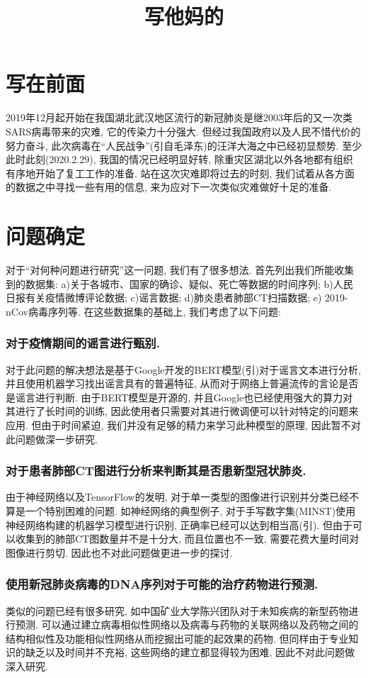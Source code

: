 \documentclass[lang=cn,11pt]{elegantpaper}
\title{写他妈的}
\date{}
\begin{document}
\maketitle

\section{写在前面}
2019年12月起开始在我国湖北武汉地区流行的新冠肺炎是继2003年后的又一次类SARS病毒带来的灾难, 它的传染力十分强大. 但经过我国政府以及人民不惜代价的努力奋斗, 此次病毒在“人民战争”(引自毛泽东)的汪洋大海之中已经初显颓势. 至少此时此刻(2020.2.29), 我国的情况已经明显好转, 除重灾区湖北以外各地都有组织有序地开始了复工工作的准备. 站在这次灾难即将过去的时刻, 我们试着从各方面的数据之中寻找一些有用的信息, 来为应对下一次类似灾难做好十足的准备. 
\section{问题确定}
对于“对何种问题进行研究”这一问题, 我们有了很多想法. 首先列出我们所能收集到的数据集: a)关于各城市、国家的确诊、疑似、死亡等数据的时间序列; b)人民日报有关疫情微博评论数据; c)谣言数据; d)肺炎患者肺部CT扫描数据; e) 2019-nCov病毒序列等. 在这些数据集的基础上, 我们考虑了以下问题:
\subsubsection*{对于疫情期间的谣言进行甄别.} 
对于此问题的解决想法是基于Google开发的BERT模型(引)对于谣言文本进行分析, 并且使用机器学习找出谣言具有的普遍特征, 从而对于网络上普遍流传的言论是否是谣言进行判断. 由于BERT模型是开源的, 并且Google也已经使用强大的算力对其进行了长时间的训练, 因此使用者只需要对其进行微调便可以针对特定的问题来应用. 但由于时间紧迫, 我们并没有足够的精力来学习此种模型的原理, 因此暂不对此问题做深一步研究. 
\subsubsection*{对于患者肺部CT图进行分析来判断其是否患新型冠状肺炎.}
由于神经网络以及TensorFlow的发明, 对于单一类型的图像进行识别并分类已经不算是一个特别困难的问题. 如神经网络的典型例子, 对于手写数字集(MINST)使用神经网络构建的机器学习模型进行识别, 正确率已经可以达到相当高(引). 但由于可以收集到的肺部CT图数量并不是十分大, 而且位置也不一致, 需要花费大量时间对图像进行剪切. 因此也不对此问题做更进一步的探讨. 
\subsubsection*{使用新冠肺炎病毒的DNA序列对于可能的治疗药物进行预测. }
类似的问题已经有很多研究, 如中国矿业大学陈兴团队对于未知疾病的新型药物进行预测. 可以通过建立病毒相似性网络以及病毒与药物的关联网络以及药物之间的结构相似性及功能相似性网络从而挖掘出可能的起效果的药物. 但同样由于专业知识的缺乏以及时间并不充裕, 这些网络的建立都显得较为困难, 因此不对此问题做深入研究. 
\end{document}
